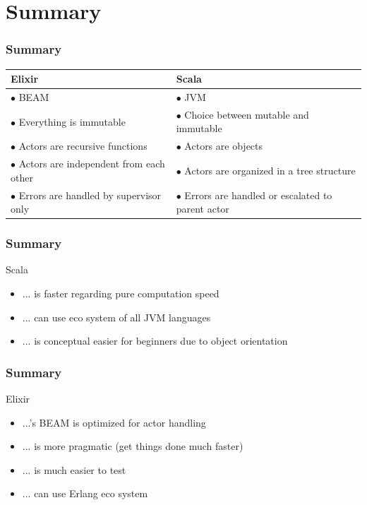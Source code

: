 \documentclass{beamer}
\begin{document}

\section{Summary}


\begin{frame}
\frametitle{Summary}
\begin{table}
\begin{tabular}{p{5cm} p{5cm}}
\toprule
\textbf{Elixir} & \textbf{Scala}\\
\midrule
$\bullet$ BEAM & $\bullet$ JVM \\
$\bullet$ Everything is immutable & $\bullet$ Choice between mutable and immutable\\
$\bullet$ Actors are recursive functions & $\bullet$ Actors are objects\\
$\bullet$ Actors are independent from each other & $\bullet$ Actors are organized in a tree structure \\
$\bullet$ Errors are handled by supervisor only & $\bullet$ Errors are handled or escalated to parent actor\\\bottomrule
\end{tabular}
\end{table}
\end{frame}



\begin{frame}
\frametitle{Summary}
\Huge{Scala}
\Large
\begin{itemize}[<+->]
\item ... is faster regarding pure computation speed
\item ... can use eco system of all JVM languages
\item ... is conceptual easier for beginners due to object orientation
\end{itemize}
\end{frame}


\begin{frame}
\frametitle{Summary}
\Huge{Elixir}
\Large
\begin{itemize}[<+->]
\item ...'s BEAM is optimized for actor handling
\item ... is more pragmatic (get things done much faster)
\item ... is much easier to test
\item ... can use Erlang eco system
\end{itemize}
\end{frame}
\end{document}
